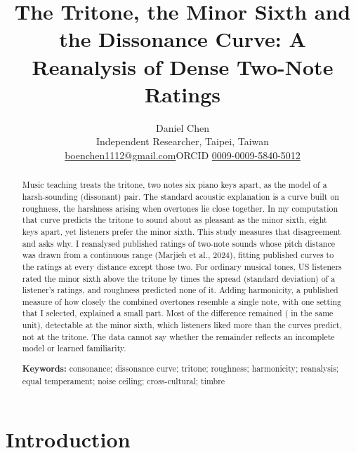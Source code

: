 \documentclass[11pt,a4paper]{article}
\title{The Tritone, the Minor Sixth and the Dissonance Curve: A Reanalysis of Dense Two-Note Ratings}
\author{Daniel Chen\\[2pt]\normalsize Independent Researcher, Taipei, Taiwan\\[2pt]
  \small \href{mailto:boenchen1112@gmail.com}{boenchen1112@gmail.com}\quad ORCID \href{https://orcid.org/0009-0009-5840-5012}{0009-0009-5840-5012}}
\date{}
\begin{document}
\maketitle

\begin{abstract}
\noindent
Music teaching treats the tritone, two notes six piano keys apart, as the model of a
harsh-sounding (dissonant) pair. The standard acoustic explanation is a curve built on
roughness, the harshness arising when overtones lie close together. In
my computation that curve predicts the tritone to sound about as pleasant as the
minor sixth, eight keys apart, yet listeners prefer the minor sixth. This study measures
that disagreement and asks why. I reanalysed published ratings of two-note
sounds whose pitch distance was drawn from a continuous range (Marjieh et al., 2024),
fitting published curves to the ratings at every distance except those two. For ordinary musical tones, US listeners rated the minor
sixth above the tritone by \poolGapObsHarm{} times the spread (standard deviation) of a listener's ratings,
and roughness predicted none of it. Adding harmonicity, a published measure of
how closely the combined overtones resemble a single note, with one setting that I selected,
explained a small part. Most of the difference remained (\primGap{} in the same unit),
detectable at the minor sixth, which listeners liked more than the curves predict, not at the
tritone. The data cannot say whether the remainder reflects an incomplete model or learned
familiarity.

\medskip\noindent\textbf{Keywords:} consonance; dissonance curve; tritone; roughness;
harmonicity; reanalysis; equal temperament; noise ceiling; cross-cultural; timbre
\end{abstract}

\section{Introduction}
\end{document}
